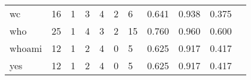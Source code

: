 \begin{longtable}{lp{1.2cm}p{1.2cm}p{1.2cm}p{1.2cm}p{1.2cm}p{1.2cm}p{1.2cm}p{1.2cm}p{1.2cm}p{1.2cm}}
wc        &                                    16 &                                                  1 &                                                  3 &                                                  4 &                                                  2 &                                                  6 &                                              0.641 &                                              0.938 &                                              0.375 \\
who       &                                    25 &                                                  1 &                                                  4 &                                                  3 &                                                  2 &                                                 15 &                                              0.760 &                                              0.960 &                                              0.600 \\
whoami    &                                    12 &                                                  1 &                                                  2 &                                                  4 &                                                  0 &                                                  5 &                                              0.625 &                                              0.917 &                                              0.417 \\
yes       &                                    12 &                                                  1 &                                                  2 &                                                  4 &                                                  0 &                                                  5 &                                              0.625 &                                              0.917 &                                              0.417 \\
\end{longtable}
